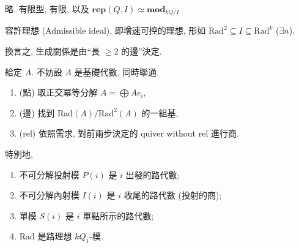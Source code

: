 \begin{definition}[箭圖]
    略. 有限型, 有限, 以及 $𝐫𝐞𝐩(Q, I) ≃ 𝐦𝐨𝐝_{kQ/I}$ 
\end{definition}

\begin{definition}[容許理想]\label{admissibleideal}
    容許理想 (Admissible ideal), 即增速可控的理想, 形如 $\mathrm{Rad}^2 ⊆ I ⊆ \mathrm{Rad}^k$ ($∃ n$). 
\end{definition}

\begin{remark}
    換言之, 生成關係是由``長 $≥2$ 的邊''決定. 
\end{remark}

\begin{theorem}
    給定 $A$. 不妨設 $A$ 是基礎代數, 同時聯通. 
    \begin{enumerate}
        \item (點) 取正交冪等分解 $A = ⨁ A e_i$, 
        \item (邊) 找到 $\mathrm{Rad}(A) / \mathrm{Rad}^2(A)$ 的一組基, 
        \item (rel) 依照需求, 對前兩步決定的 quiver without rel 進行商. 
    \end{enumerate}
    特別地, 
    \begin{enumerate}
        \item 不可分解投射模 $P(i)$ 是 $i$ 出發的路代數;
        \item 不可分解內射模 $I(i)$ 是 $i$ 收尾的路代數 (投射的商);
        \item 單模 $S(i)$ 是 $i$ 單點所示的路代數; 
        \item $\mathrm{Rad}$ 是路理想 $kQ_1$-模.
    \end{enumerate}
\end{theorem}

